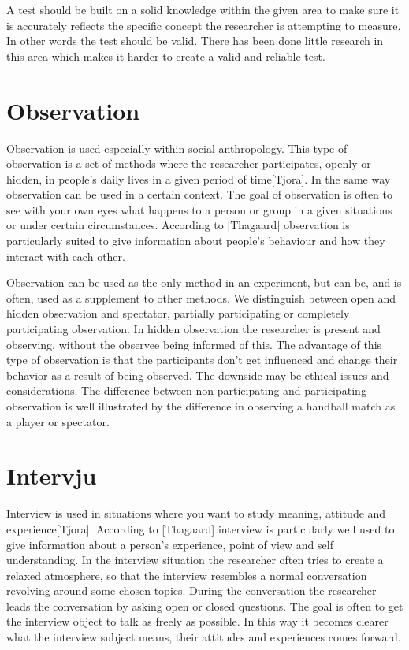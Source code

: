 \bigskip\noindent
A test should be built on a solid knowledge within the given area to make sure it is accurately reflects the specific concept the researcher is attempting to measure. In other words the test should be valid. There has been done little research in this area which makes it harder to create a valid and reliable test.

\section{Observation}
Observation is used especially within social anthropology. This type of observation is a set of methods where the researcher participates, openly or hidden, in people’s daily lives in a given period of time[Tjora]. In the same way observation can be used in a certain context. The goal of observation is often to see with your own eyes what happens to a person or group in a given situations or under certain circumstances. According to [Thagaard] observation is particularly suited to give information about people’s behaviour and how they interact with each other. 

\bigskip\noindent
Observation can be used as the only method in an experiment, but can be, and is often, used as a supplement to other methods. We distinguish between open and hidden observation and spectator, partially participating or completely participating observation. In hidden observation the researcher is present and observing, without the observee being informed of this. The advantage of this type of observation is that the participants don’t get influenced and change their behavior as a result of being observed. The downside may be ethical issues and considerations. The difference between non-participating and participating observation is well illustrated by the difference in observing a handball match as a player or spectator. 
\section{Intervju}
Interview is used in situations where you want to study meaning, attitude and experience[Tjora]. According to [Thagaard] interview is particularly well used to give information about a person’s experience, point of view and self understanding. In the interview situation the researcher often tries to create a relaxed atmosphere, so that the interview resembles a normal conversation revolving around some chosen topics. During the conversation the researcher leads the conversation by asking open or closed questions. The goal is often to get the interview object to talk as freely as possible. In this way it becomes clearer what the interview subject means, their attitudes and experiences comes forward. 

